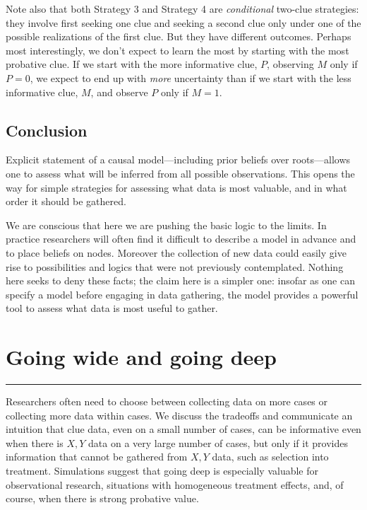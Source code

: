\documentclass[12pt,]{book}
\begin{document}
Note also that both Strategy 3 and Strategy 4 are \emph{conditional} two-clue strategies: they involve first seeking one clue and seeking a second clue only under one of the possible realizations of the first clue. But they have different outcomes. Perhaps most interestingly, we don't expect to learn the most by starting with the most probative clue. If we start with the more informative clue, \(P\), observing \(M\) only if \(P=0\), we expect to end up with \emph{more} uncertainty than if we start with the less informative clue, \(M\), and observe \(P\) only if \(M=1\).

\hypertarget{conclusion-2}{%
\section{Conclusion}\label{conclusion-2}}

Explicit statement of a causal model---including prior beliefs over roots---allows one to assess what will be inferred from all possible observations. This opens the way for simple strategies for assessing what data is most valuable, and in what order it should be gathered.

We are conscious that here we are pushing the basic logic to the limits. In practice researchers will often find it difficult to describe a model in advance and to place beliefs on nodes. Moreover the collection of new data could easily give rise to possibilities and logics that were not previously contemplated. Nothing here seeks to deny these facts; the claim here is a simpler one: insofar as one can specify a model before engaging in data gathering, the model provides a powerful tool to assess what data is most useful to gather.

\hypertarget{wide}{%
\chapter{Going wide and going deep}\label{wide}}

\begin{center}\rule{0.5\linewidth}{\linethickness}\end{center}

Researchers often need to choose between collecting data on more cases or collecting more data within cases. We discuss the tradeoffs and communicate an intuition that clue data, even on a small number of cases, can be informative even when there is \(X, Y\) data on a very large number of cases, but only if it provides information that cannot be gathered from \(X,Y\) data, such as selection into treatment. Simulations suggest that going deep is especially valuable for observational research, situations with homogeneous treatment effects, and, of course, when there is strong probative value.
\end{document}
